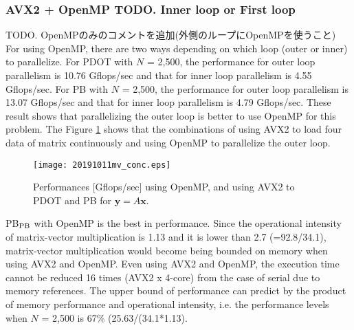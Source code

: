 \documentclass{IOS-Book-Article}
\begin{document}
\subsubsection{AVX2 + OpenMP TODO. Inner loop or First loop}
TODO. OpenMPのみのコメントを追加(外側のループにOpenMPを使うこと)
For using OpenMP, there are two ways depending on which loop (outer or inner) to parallelize. 
For PDOT with $N$ = 2,500, the performance for outer loop parallelism is 10.76 Gflops/sec and that for inner loop parallelism is 4.55 Gflops/sec.
For PB with $N$ = 2,500, the performance for outer loop parallelism is 13.07 Gflops/sec and that for inner loop parallelism is 4.79 Gflops/sec.
These result shows that parallelizing the outer loop is better to use OpenMP for this problem. 
The Figure \ref{figMM} shows that the combinations of using AVX2 to load four data of matrix continuously and using OpenMP to parallelize the outer loop.

\begin{figure}[htbp]
  \begin{center}
    \texttt{[image: 20191011mv\_conc.eps]}
        \caption{Performances [Gflops/sec] using OpenMP, and using AVX2 to PDOT and PB for $\bm{y} = A\bm{x}$.}
    \label{figMM}
  \end{center}
\end{figure}


PB$_{\rm{PB}}$ with OpenMP is the best in performance. 
Since the operational intensity of matrix-vector multiplication is 1.13 and it is lower than 2.7 (=92.8/34.1), matrix-vector multiplication would become being bounded on memory when using AVX2 and OpenMP.
Even using AVX2 and OpenMP, the execution time cannot be reduced 16 times (AVX2 x 4-core) from the case of serial due to memory references. 
The upper bound of performance can predict by the product of memory performance and operational intensity, i.e. the performance levels when $N$ = 2,500 is 67\% (25.63/(34.1*1.13).
\end{document}
